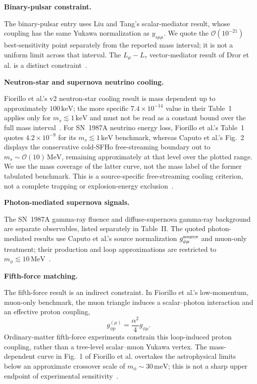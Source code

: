 \documentclass[12pt,a4paper]{article}
\begin{document}
\noindent\textbf{Binary-pulsar constraint.}

The binary-pulsar entry uses Liu and Tang's scalar-mediator result, whose coupling has the same Yukawa normalization as \(y_{s\mu\mu}\). We quote the \(\mathcal O(10^{-21})\) best-sensitivity point separately from the reported mass interval; it is not a uniform limit across that interval. The \(L_\mu-L_\tau\) vector-mediator result of Dror et al. is a distinct constraint~\cite{Liu:2025zuz,Dror:2019uea}.

\noindent\textbf{Neutron-star and supernova neutrino cooling.}

Fiorillo et al.'s v2 neutron-star cooling result is mass dependent up to approximately \(100\,\mathrm{keV}\); the more specific \(7.4\times10^{-14}\) value in their Table~1 applies only for \(m_s\lesssim1\,\mathrm{keV}\) and must not be read as a constant bound over the full mass interval~\cite{Fiorillo:2026wso}. For SN~1987A neutrino energy loss, Fiorillo et al.'s Table~1 quotes \(4.2\times10^{-9}\) for its \(m_s\lesssim1\,\mathrm{keV}\) benchmark, whereas Caputo et al.'s Fig.~2 displays the conservative cold-SFHo free-streaming boundary out to \(m_s\sim\mathcal O(10)\,\mathrm{MeV}\), remaining approximately at that level over the plotted range. We use the mass coverage of the latter curve, not the mass label of the former tabulated benchmark. This is a source-specific free-streaming cooling criterion, not a complete trapping or explosion-energy exclusion~\cite{Caputo:2021rux,Fiorillo:2026wso}.

\noindent\textbf{Photon-mediated supernova signals.}

The SN~1987A gamma-ray fluence and diffuse-supernova gamma-ray background are separate observables, listed separately in Table~II. The quoted photon-mediated results use Caputo et al.'s source normalization \(g_{\phi\mu}^{\rm source}\) and muon-only treatment; their production and loop approximations are restricted to \(m_\phi\lesssim10\,\mathrm{MeV}\)~\cite{Caputo:2021rux}.

\noindent\textbf{Fifth-force matching.}

The fifth-force result is an indirect constraint. In Fiorillo et al.'s low-momentum, muon-only benchmark, the muon triangle induces a scalar--photon interaction and an effective proton coupling,
\[
g_{\phi p}^{(\mu)}=\frac{\alpha^2}{4}g_{\phi\mu}.
\]
Ordinary-matter fifth-force experiments constrain this loop-induced proton coupling, rather than a tree-level scalar--muon Yukawa vertex. The mass-dependent curve in Fig.~1 of Fiorillo et al. overtakes the astrophysical limits below an approximate crossover scale of \(m_\phi\sim30\,\mathrm{meV}\); this is not a sharp upper endpoint of experimental sensitivity~\cite{Fiorillo:2026wso}.
\end{document}
